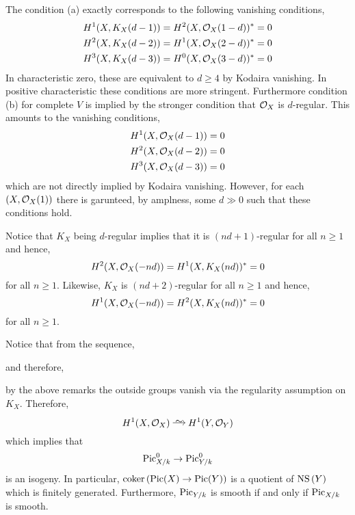 \documentclass[12pt]{article}
\begin{document}
\begin{rmk}
The condition (a) exactly corresponds to the following vanishing conditions,
\begin{align*}
H^1(X, K_X(d-1)) &= H^2(X, \mathcal{O}_{X}(1-d))^* = 0
\\
H^2(X, K_X(d-2)) &= H^1(X, \mathcal{O}_{X}(2-d))^* = 0
\\
H^3(X, K_X(d-3)) &= H^0(X, \mathcal{O}_{X}(3-d))^* = 0
\end{align*}
In characteristic zero, these are equivalent to $d \ge 4$ by Kodaira vanishing. In positive characteristic these conditions are more stringent. Furthermore condition (b) for complete $V$ is implied by the stronger condition that $\mathcal{O}_{X}$ is $d$-regular. This amounts to the vanishing conditions,
\begin{align*}
H^1(X, \mathcal{O}_{X}(d-1)) &= 0
\\
H^2(X, \mathcal{O}_{X}(d-2)) &= 0
\\
H^3(X, \mathcal{O}_{X}(d-3)) &= 0
\end{align*}
which are not directly implied by Kodaira vanishing. However, for each $(X, \mathcal{O}_{X}(1))$ there is garunteed, by amplness, some $d \gg 0$ such that these conditions hold. 
\end{rmk}

\begin{rmk}
Notice that $K_X$ being $d$-regular implies that it is $(nd+1)$-regular for all $n \ge 1$ and hence,
\[ H^2(X, \mathcal{O}_{X}(-nd)) = H^1(X, K_X(nd))^* = 0 \]
for all $n \ge 1$. Likewise, $K_X$ is $(nd + 2)$-regular for all $n \ge 1$ and hence,
\[ H^1(X, \mathcal{O}_{X}(-nd)) = H^2(X, K_X(nd))^* = 0 \]
for all $n \ge 1$.
\end{rmk}

\begin{rmk}
Notice that from the sequence,
\begin{center}
\end{center}
and therefore,
\begin{center}
\end{center}
by the above remarks the outside groups vanish via the regularity assumption on $K_X$. Therefore, 
\[ H^1(X, \struct{X}) \iso H^1(Y, \struct{Y}) \]
which implies that
\[ \mathrm{Pic}^0_{X/k} \to \mathrm{Pic}^0_{Y/k} \]
is an isogeny. In particular, $\operatorname{\mathrm{coker}}{(\mathrm{Pic}(X) \to \mathrm{Pic}(Y))}$ is a quotient of $\mathrm{NS}\left( Y \right)$ which is finitely generated. Furthermore, $\mathrm{Pic}_{Y/k}$ is smooth if and only if $\mathrm{Pic}_{X/k}$ is smooth.
\end{rmk}
\end{document}
